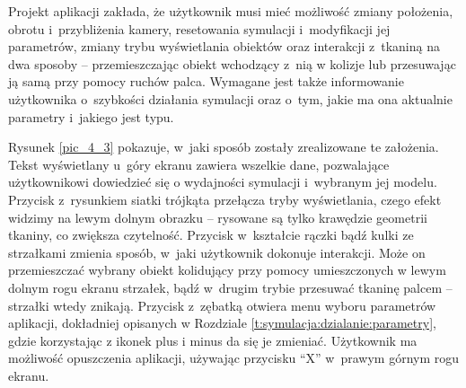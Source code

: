 		
		
		Projekt aplikacji zakłada, że użytkownik musi mieć możliwość zmiany położenia, obrotu i~przybliżenia kamery, resetowania symulacji i~modyfikacji jej parametrów, zmiany trybu wyświetlania obiektów oraz interakcji z~tkaniną na dwa sposoby -- przemieszczając obiekt wchodzący z~nią w kolizje lub przesuwając ją samą przy pomocy ruchów palca. Wymagane jest także informowanie użytkownika o~szybkości działania symulacji oraz o~tym, jakie ma ona aktualnie parametry i~jakiego jest typu.
		
		Rysunek \ref{pic_4_3} pokazuje, w~jaki sposób zostały zrealizowane te założenia. Tekst wyświetlany u~góry ekranu zawiera wszelkie dane, pozwalające użytkownikowi dowiedzieć się o wydajności symulacji i~wybranym jej modelu. Przycisk z~rysunkiem siatki trójkąta przełącza tryby wyświetlania, czego efekt widzimy na lewym dolnym obrazku -- rysowane są tylko krawędzie geometrii tkaniny, co zwiększa czytelność. Przycisk w~kształcie rączki bądź kulki ze strzałkami zmienia sposób, w~jaki użytkownik dokonuje interakcji. Może on przemieszczać wybrany obiekt kolidujący przy pomocy umieszczonych w lewym dolnym rogu ekranu strzałek, bądź w~drugim trybie przesuwać tkaninę palcem -- strzałki wtedy znikają. Przycisk z~zębatką otwiera menu wyboru parametrów aplikacji, dokładniej opisanych w Rozdziale \ref{t:symulacja:dzialanie:parametry}, gdzie korzystając z ikonek plus i minus da się je zmieniać. Użytkownik ma możliwość opuszczenia aplikacji, używając przycisku ``X'' w~prawym górnym rogu ekranu.
